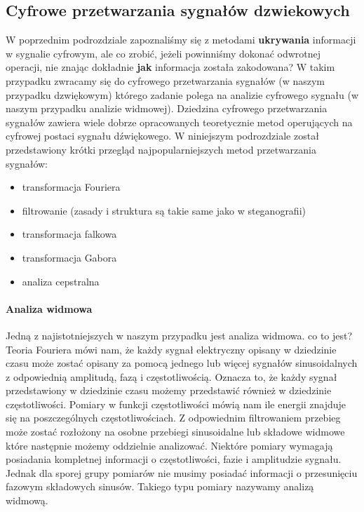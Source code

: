 \documentclass[a4paper,titleauthor]{mwart}
\begin{document}
	\subsection{Cyfrowe przetwarzania sygnałów dzwiekowych}
	
	W poprzednim podrozdziale zapoznaliśmy się z metodami \textbf{ukrywania} informacji w sygnalie cyfrowym, ale co zrobić, jeżeli powinniśmy dokonać odwrotnej operacji, nie znając dokładnie \textbf{jak} informacja została zakodowana?\newline \newline
	W takim przypadku zwracamy się do cyfrowego przetwarzania sygnałów (w naszym przypadku dzwiękowym) którego zadanie polega na analizie cyfrowego sygnału (w naszym przypadku analizie widmowej).\newline \newline
	Dziedzina cyfrowego przetwarzania sygnałów zawiera wiele dobrze opracowanych teoretycznie metod operujących na cyfrowej postaci sygnału dźwiękowego. W niniejszym podrozdziale został przedstawiony krótki przegląd najpopularniejszych metod przetwarzania sygnałów:
	
	\begin{itemize}
		\item transformacja Fouriera
		\item filtrowanie (zasady i struktura są takie same jako w steganografii)
		\item transformacja falkowa
		\item transformacja Gabora
		\item analiza cepstralna
	\end{itemize}	
	
	\paragraph{Analiza widmowa}
	
	Jedną z najistotniejszych w naszym przypadku jest analiza widmowa.\newline \newline
	co to jest? \newline \newline
	Teoria Fouriera mówi nam, że każdy sygnał elektryczny opisany w dziedzinie czasu może zostać opisany za pomocą jednego lub więcej sygnałów sinusoidalnych z odpowiednią amplitudą, fazą i częstotliwością. Oznacza to, że każdy sygnał przedstawiony w dziedzinie czasu możemy przedstawić również w dziedzinie częstotliwości. Pomiary w funkcji częstotliwości mówią nam ile energii znajduje się na poszczególnych częstotliwościach. Z odpowiednim filtrowaniem przebieg może zostać rozłożony na osobne przebiegi sinusoidalne lub składowe widmowe które następnie możemy oddzielnie analizować. Niektóre pomiary wymagają posiadania kompletnej informacji o częstotliwości, fazie i amplitudzie sygnału. Jednak dla sporej grupy pomiarów nie musimy posiadać informacji o przesunięciu fazowym składowych sinusów. Takiego typu pomiary nazywamy analizą widmową.
	
\end{document}
